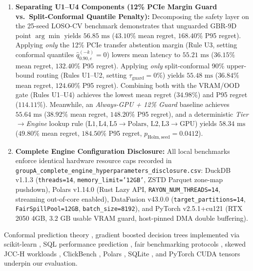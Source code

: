 \documentclass[10pt,a4paper]{article}
\begin{document}
\begin{enumerate}
\item \textbf{Separating U1--U4 Components (12\% PCIe Margin Guard vs.\ Split-Conformal Quantile Penalty):} Decomposing the safety layer on the 25-seed LOSO-CV benchmark demonstrates that unguarded $\mathrm{GBR\mbox{-}9D}$ point $\arg\min$ yields $56.85\text{ ms}$ ($43.10\%$ mean regret, $168.40\%$ P95 regret). Applying \emph{only} the 12\% PCIe transfer abstention margin (Rule U3, setting conformal quantiles $\hat{q}_{0.90,e}^{(-k)}=0$) lowers mean latency to $55.21\text{ ms}$ ($36.15\%$ mean regret, $132.40\%$ P95 regret). Applying \emph{only} split-conformal 90\% upper-bound routing (Rules U1--U2, setting $\tau_{\mathrm{guard}}=0\%$) yields $55.48\text{ ms}$ ($36.84\%$ mean regret, $124.60\%$ P95 regret). Combining both with the VRAM/OOD gate (Rules U1--U4) achieves the lowest mean regret ($34.98\%$) and P95 regret ($114.11\%$). Meanwhile, an \emph{Always-GPU + 12\% Guard} baseline achieves $55.64\text{ ms}$ ($38.92\%$ mean regret, $148.20\%$ P95 regret), and a deterministic \emph{Tier$\to$Engine} lookup rule ($\mathrm{L1,L4,L5}\to\text{Polars}$, $\mathrm{L2,L3}\to\text{GPU}$) yields $58.34\text{ ms}$ ($49.80\%$ mean regret, $184.50\%$ P95 regret, $p_{\mathrm{Holm,seed}}=0.0412$).
\item \textbf{Complete Engine Configuration Disclosure:} All local benchmarks enforce identical hardware resource caps recorded in \texttt{groupA\_complete\_engine\_hyperparameters\_disclosure.csv}: DuckDB v1.1.3 (\texttt{threads=14}, \texttt{memory\_limit='12GB'}, ZSTD Parquet zone-map pushdown), Polars v1.14.0 (Rust Lazy API, \texttt{RAYON\_NUM\_THREADS=14}, streaming out-of-core enabled), DataFusion v43.0.0 (\texttt{target\_partitions=14}, \texttt{FairSpillPool=12GB}, \texttt{batch\_size=8192}), and PyTorch v2.5.1+cu121 (RTX 2050 4GB, $3.2\text{ GB}$ usable VRAM guard, host-pinned DMA double buffering).
\end{enumerate}
Conformal prediction theory \cite{vovk2005algorithmic,angelopoulos2023conformal}, gradient boosted decision trees \cite{friedman2001greedy} implemented via scikit-learn \cite{pedregosa2011scikit}, SQL performance prediction \cite{ganapathi2009predicting,nathan2024stage}, fair benchmarking protocols \cite{raasveldt2018fair}, skewed JCC-H workloads \cite{boncz2017jcch}, ClickBench \cite{clickbench2022}, Polars \cite{vink2024polars}, SQLite \cite{hipp2020sqlite}, and PyTorch CUDA tensors \cite{paszke2019pytorch} underpin our evaluation.

\end{document}
